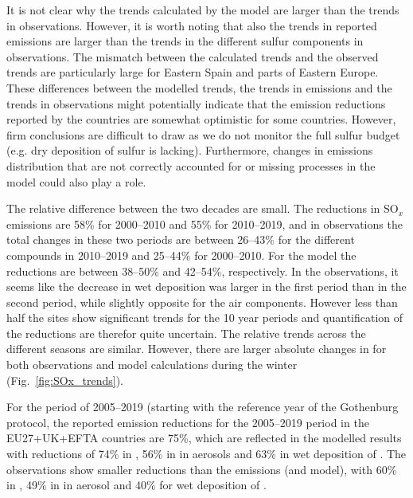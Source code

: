 It is not clear why the trends calculated by the model are larger than the trends in observations. However, it is worth noting that also the trends in reported emissions are larger than the trends in the different sulfur components in observations. The mismatch between the calculated trends and the observed trends are particularly large for Eastern Spain and parts of Eastern Europe. These differences between the modelled trends, the trends in emissions and the trends in observations might potentially indicate that the emission reductions reported by the countries are somewhat optimistic for some countries. However, firm conclusions are difficult to draw as we do not monitor the full sulfur budget (e.g. dry deposition of sulfur is lacking). Furthermore, changes in emissions distribution that are not correctly accounted for or missing processes in the model could also play a role.

The relative difference between the two decades are small. The reductions in SO$_x$ emissions are 58\% for 2000--2010 and 55\% for 2010--2019, and in observations the total changes in these two periods are between 26--43\% for the different compounds in 2010--2019 and 25--44\% for 2000--2010. For the model the reductions are between 38--50\% and 42--54\%, respectively.  In the observations, it seems like the decrease in wet deposition was larger in the first period than in the second period, while slightly opposite for the air components. However less than half the sites show significant trends for the 10 year periods and quantification of the reductions are therefor quite uncertain. 
The relative trends across the different seasons are similar.
However, there are larger absolute changes in \soii for both observations and model calculations during the winter (Fig.~\ref{fig:SOx_trends}).%

For the period of 2005--2019 (starting with the reference year of the Gothenburg protocol, the reported emission reductions for the 2005--2019 period in the EU27+UK+EFTA countries are 75\%, which are reflected in the modelled results with reductions of 74\% in \soii, 56\% in \soiv in aerosols and 63\% in wet deposition of \soiv. The observations show smaller reductions than the emissions (and model), with 60\% in \soii, 49\% in \soiv in aerosol and 40\% for wet deposition of \soiv.




